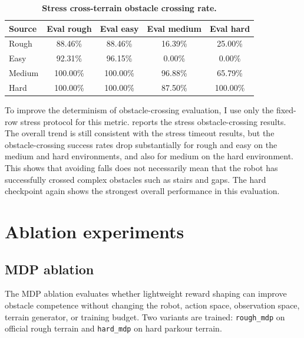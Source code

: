 \documentclass{article}
\begin{document}
\begin{table}[t]
    \caption{\textbf{Stress cross-terrain obstacle crossing rate.}}
    \label{tab:stress-cross-obstacle}
    \centering
    \begin{tabular}{lcccc}
        \toprule
        Source & Eval rough & Eval easy & Eval medium & Eval hard \\
        \midrule
        Rough & 88.46\% & 88.46\% & 16.39\% & 25.00\% \\
        Easy & 92.31\% & 96.15\% & 0.00\% & 0.00\% \\
        Medium & 100.00\% & 100.00\% & 96.88\% & 65.79\% \\
        Hard & 100.00\% & 100.00\% & 87.50\% & 100.00\% \\
        \bottomrule
    \end{tabular}
\end{table}

To improve the determinism of obstacle-crossing evaluation, I use only the fixed-row stress protocol for this metric.  reports the stress obstacle-crossing results. The overall trend is still consistent with the stress timeout results, but the obstacle-crossing success rates drop substantially for rough and easy on the medium and hard environments, and also for medium on the hard environment. This shows that avoiding falls does not necessarily mean that the robot has successfully crossed complex obstacles such as stairs and gaps. The hard checkpoint again shows the strongest overall performance in this evaluation.

\section{Ablation experiments}
\label{sec:ablations}

\subsection{MDP ablation}
The MDP ablation evaluates whether lightweight reward shaping can improve obstacle competence without changing the robot, action space, observation space, terrain generator, or training budget. Two variants are trained: \texttt{rough\_mdp} on official rough terrain and \texttt{hard\_mdp} on hard parkour terrain.
\end{document}
